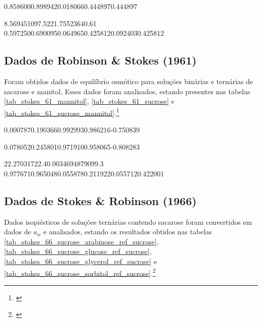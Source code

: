 %
	{\text{---}}{\text{---}}{\text{---}}{\text{---}}
\tablebisecond{\text{---}}{\text{---}}
%
	{0.858600}{0.898942}{0.018066}{0.444897}{\text{---}}{0.444897}


%
	{8.56945}{1097.52}{21.7552}{3640.61}
%
	{0.597250}{0.690095}{0.064965}{0.425812}{0.092403}{0.425812}

\FloatBarrier

\subsection{Dados de Robinson \& Stokes (1961)}

Foram obtidos dados de equilíbrio osmótico para soluções binárias e ternárias
de sacarose e manitol. Esses dados foram analisados, estando presentes nas tabelas
\ref{tab_stokes_61_mannitol}, \ref{tab_stokes_61_sucrose} e
\ref{tab_stokes_61_sucrose_mannitol}.\footnote{\cite{stokes1961}}

%
	{0.000787}{0.190366}{0.992993}{0.986216}{-0.750839}

%
	{0.078052}{0.245801}{0.971910}{0.958065}{-0.808283}

%
	{22.2703}{1722.4}{0.00346948}{79099.3}
%
	{0.977671}{0.965048}{0.055878}{0.211922}{0.055712}{0.422001}

\FloatBarrier

\subsection{Dados de Stokes \& Robinson (1966)}

Dados isopiésticos de soluções ternárias contendo sacarose foram convertidos
em dados de $a_w$ e analisados, estando os resultados obtidos nas tabelas
\ref{tab_stokes_66_sucrose_arabinose_ref_sucrose},
\ref{tab_stokes_66_sucrose_glucose_ref_sucrose},
\ref{tab_stokes_66_sucrose_glycerol_ref_sucrose} e
\ref{tab_stokes_66_sucrose_sorbitol_ref_sucrose}.\footnote{\cite{stokes1966}}


